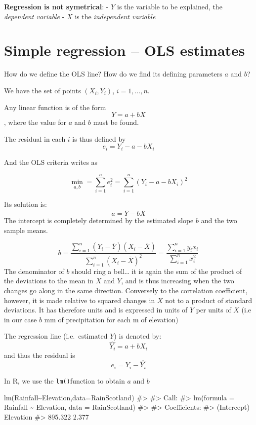 \documentclass[
  letterpaper,
  DIV=11,
  numbers=noendperiod]{scrreprt}
\newenvironment{Shaded}{\begin{snugshade}}{\end{snugshade}}
\newcommand{\AttributeTok}[1]{\textcolor[rgb]{0.40,0.45,0.13}{#1}}
\newcommand{\CommentTok}[1]{\textcolor[rgb]{0.37,0.37,0.37}{#1}}
\newcommand{\FunctionTok}[1]{\textcolor[rgb]{0.28,0.35,0.67}{#1}}
\newcommand{\NormalTok}[1]{\textcolor[rgb]{0.00,0.23,0.31}{#1}}
\newcommand{\SpecialCharTok}[1]{\textcolor[rgb]{0.37,0.37,0.37}{#1}}
\begin{document}
\textbf{Regression is not symetrical}: - \(Y\) is the variable to be
explained, the \emph{dependent variable} - \(X\) is the
\emph{independent variable}

\section{Simple regression -- OLS
estimates}\label{simple-regression-ols-estimates}

How do we define the OLS line? How do we find its defining parameters
\(a\) and \(b\)?

We have the set of points \((X_i,Y_i)\), \(i=1,…,n\).

Any linear function is of the form \[Y = a + bX\], where the value for
\(a\) and \(b\) must be found.

The residual in each \(i\) is thus defined by \[e_i = Y_i - a - bX_i\]

And the OLS criteria writes as

\[\min_{a,b} = \sum_{i=1}^n e_i^2 = \sum_{i=1}^n (Y_i - a - bX_i)^2\]

Its solution is: \[a = \bar{Y}-b\bar{X}\] The intercept is completely
determined by the estimated slope \(b\) and the two sample means.

\[b = \dfrac{\sum_{i=1}^n (Y_i - \bar{Y})(X_i - \bar{X})}{\sum_{i=1}^n (X_i - \bar{X})^2} = \dfrac{\sum_{i=1}^n y_i x_i}{\sum_{i=1}^n x_i^2}\]
The denominator of \(b\) should ring a bell\ldots{} it is again the sum
of the product of the deviations to the mean in \(X\) and \(Y\), and is
thus increasing when the two changes go along in the same direction.
Conversely to the correlation coefficient, however, it is made relative
to squared changes in \(X\) not to a product of standard deviations. It
has therefore units and is expressed in units of \(Y\) per units of
\(X\) (i.e in our case \(b\) mm of precipitation for each m of
elevation)

The regression line (i.e.~estimated \(Y\)) is denoted by:
\[\hat{Y_i} = a + b X_i\] and thus the residual is
\[e_i = Y_i - \hat{Y_i}\]

In R, we use the \texttt{lm()}function to obtain \(a\) and \(b\)

\begin{Shaded}
\begin{Highlighting}[]
\FunctionTok{lm}\NormalTok{(Rainfall}\SpecialCharTok{\textasciitilde{}}\NormalTok{Elevation,}\AttributeTok{data=}\NormalTok{RainScotland)}
\CommentTok{\#\textgreater{} }
\CommentTok{\#\textgreater{} Call:}
\CommentTok{\#\textgreater{} lm(formula = Rainfall \textasciitilde{} Elevation, data = RainScotland)}
\CommentTok{\#\textgreater{} }
\CommentTok{\#\textgreater{} Coefficients:}
\CommentTok{\#\textgreater{} (Intercept)    Elevation  }
\CommentTok{\#\textgreater{}     895.322        2.377}
\end{Highlighting}
\end{Shaded}
\end{document}

